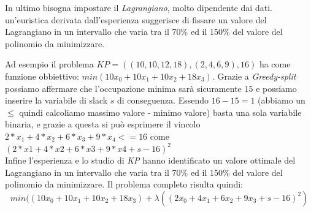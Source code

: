 \documentclass[a4paper]{article}
\begin{document}
In ultimo bisogna impostare il \textit{Lagrangiano}, molto dipendente dai dati. un'euristica derivata dall'esperienza suggerisce di fissare un valore del Lagrangiano in un intervallo che varia tra il 70\% ed il 150\% del valore del polinomio da minimizzare.

Ad esempio il problema $KP = ((10,10,12,18),(2,4,6,9),16)$ ha come funzione obbiettivo: $min(10x_0 + 10x_1 + 10x_2 + 18x_3)$.
Grazie a \textit{Greedy-split} possiamo affermare che l'occupazione minima sarà sicuramente $15$ e possiamo inserire la variabile di slack $s$ di conseguenza.
Essendo $16 - 15 = 1$ (abbiamo un $\leq$ quindi calcoliamo massimo valore - minimo valore) basta una sola variabile binaria, e grazie a questa si può esprimere il vincolo $2*x_1 +4*x_2 +6*x_3 +9*x_4 <= 16$ come $(2*x1 + 4*x2 +6*x3 +9*x4 + s -16)^2 $\\ %
Infine l'esperienza e lo studio di \emph{KP} hanno identificato un valore ottimale del Lagrangiano in un intervallo che varia tra il 70\% ed il 150\% del valore del polinomio da minimizzare.
Il problema completo risulta quindi: $$ min((10x_0 + 10x_1 + 10x_2 + 18x_3) + \lambda  ((2x_0 + 4x_1 +6x_2 +9x_3 + s -16 )^2)$$
\end{document}
